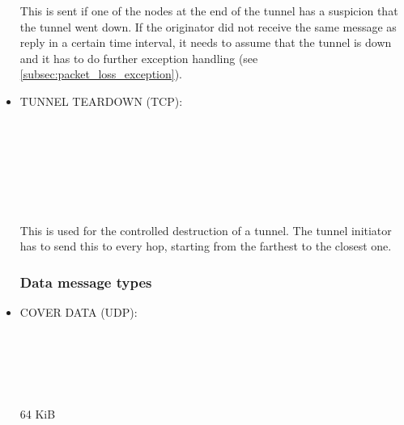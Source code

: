 \documentclass{article}
\begin{document}
\begin{itemize}
This is sent if one of the nodes at the end of the tunnel has a suspicion that the tunnel went down.
If the originator did not receive the same message as reply in a certain time interval, it needs to
assume that the tunnel is down and it has to do further exception handling (see
\ref{subsec:packet_loss_exception}).
	
\item TUNNEL TEARDOWN (TCP): \\
\begin{bytefield}[bitwidth=1.0em]{32}
	 \\
	 \\
	 \\
	\skippedwords \\
\end{bytefield}
\begin{bytefield}[bitwidth=2.2em]{16}
	 \\
\end{bytefield}

This is used for the controlled destruction of a tunnel. The tunnel initiator has to send this to every hop, starting from the farthest to the closest one.

\subsubsection{Data message types}

\item COVER DATA (UDP): \\
\begin{bytefield}[bitwidth=1.0em]{32}
	 \\
	 \\
	 \\
	\skippedwords \\
\end{bytefield}
\begin{bytefield}[bitwidth=2.2em]{16}
	\begin{rightwordgroup}{64 KiB}
		 \\
		 \\
	\end{rightwordgroup}
\end{bytefield}


\end{itemize}
\end{document}
